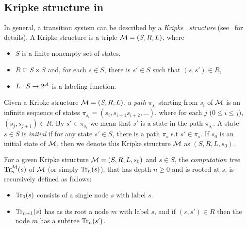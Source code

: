 \documentclass[letterpaper]{article}
\begin{document}
\subsection{Kripke structure in \CTL}
 In general, a transition system
 can be described by a  \emph{Kripke \ structure} (see~\cite{Baier:PMC:2008} for details). A Kripke structure is a triple ${\cal M}=(S,R,L)$, where
\begin{itemize}
  \item $S$ is a finite nonempty set of states, %
  \item $R\subseteq S\times S$ and, for each $s\in S$, there
  is $s'\in S$ such that $(s,s')\in R$,
  \item $L: S\rightarrow 2^{\cal A}$ is a labeling function.
\end{itemize}
Given a Kripke structure ${\cal M}=(S,R,L)$, a \emph{path} $\pi_{s_i}$ starting from $s_i$ of ${\cal M}$ is an infinite sequence of states $\pi_{s_i}=(s_i, s_{i+1} s_{i+2},\dots)$, where for each $j$ ($0\leq i\leq j$), $(s_j, s_{j+1}) \in R$. By $s'\in \pi_{s_i}$ we mean that $s'$ is a state in the path $\pi_{s_i}$.
A state $s\in S$ is {\em initial} if for any state $s'\in S$, there is a path $\pi_s$ s.t $s'\in \pi_s$.
If $s_0$ is an initial state of ${\cal M}$, then we denote this Kripke structure ${\cal M}$ as $(S,R,L,s_0)$.

For a given Kripke structure ${\cal M}=(S,R,L,s_0)$ and $s\in S$,
the {\em computation tree}
$\textrm{Tr}_n^{\cal M}(s)$ of $\cal M$ (or simply $\textrm{Tr}_n(s)$), that has depth $n \ge 0$ and is rooted at $s$, is recursively defined \cite{DBLP:journals/tcs/BrowneCG88} as follows:
\begin{itemize}
  \item $\textrm{Tr}_0(s)$ consists of a single node $s$ with label $s$.
  \item $\textrm{Tr}_{n+1}(s)$ has as its root a node $m$ with label  $s$, and
  if $(s,s')\in R$ then the node $m$ has a subtree $\textrm{Tr}_n(s')$.
\end{itemize}
\end{document}
